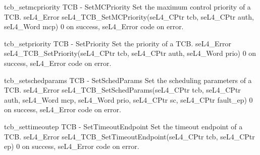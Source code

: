 \apidoc
{tcb_setmcpriority}
{TCB - SetMCPriority}
{Set the maximum control priority of a TCB.}
{seL4_Error seL4_TCB_SetMCPriority(seL4_CPtr tcb, seL4_CPtr auth, seL4_Word mcp)}
{
}
{0 on success, seL4\_Error code on error.}

\apidoc
{tcb_setpriority}
{TCB - SetPriority}
{Set the priority of a TCB.}
{seL4_Error seL4_TCB_SetPriority(seL4_CPtr tcb, seL4_CPtr auth, seL4_Word prio)}
{
}
{0 on success, seL4\_Error code on error.}

\apidoc
{tcb_setschedparams}
{TCB - SetSchedParams}
{Set the scheduling parameters of a TCB.}
{seL4\_Error seL4_TCB_SetSchedParams(seL4_CPtr tcb, seL4_CPtr auth, seL4_Word mcp,
                                       seL4_Word prio, seL4_CPtr sc, seL4_CPtr fault_ep)}
{
}
{0 on success, seL4\_Error code on error.}

\apidoc
{tcb_settimeoutep}
{TCB - SetTimeoutEndpoint}
{Set the timeout endpoint of a TCB.}
{seL4_Error seL4_TCB_SetTimeoutEndpoint(seL4_CPtr tcb, seL4_CPtr ep)}
{
}
{0 on success, seL4\_Error code on error.}
